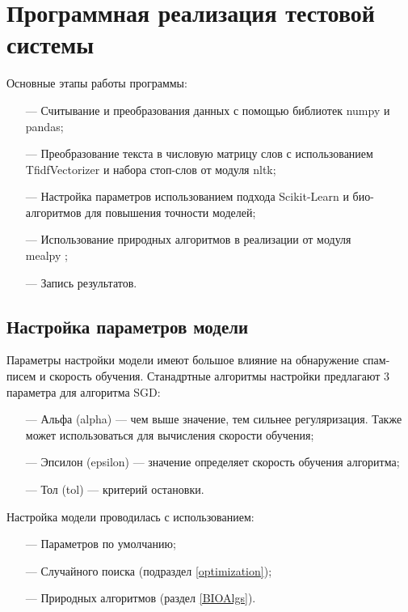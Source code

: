 \section{Программная реализация тестовой системы}

Основные этапы работы программы:

\begin{itemize}
    \item[—] Считывание и преобразования данных с помощью библиотек numpy и pandas;
    \item[—] Преобразование текста в числовую матрицу слов с использованием TfidfVectorizer\cite{scikitTfIdf} и набора стоп-слов от
        модуля nltk;
    \item[—] Настройка параметров использованием подхода Scikit-Learn \cite{scikitSGD} и био-алгоритмов
        для повышения точности моделей;
    \item[—] Использование природных алгоритмов в реализации от модуля \\mealpy \cite{thieu_nguyen_2020_3711949};
    \item[—] Запись результатов.
\end{itemize}

\subsection{Настройка параметров модели}

Параметры настройки модели имеют большое влияние на обнаружение спам-писем и скорость обучения. Станадртные
алгоритмы настройки предлагают 3 параметра для алгоритма SGD:

\begin{itemize}
    \item[—] Альфа (alpha) — чем выше значение, тем сильнее регуляризация. Также может использоваться для вычисления скорости обучения;
    \item[—] Эпсилон (epsilon) — значение определяет скорость обучения алгоритма;
    \item[—] Тол (tol) — критерий остановки.
\end{itemize}

Настройка модели проводилась с использованием:

\begin{itemize}
    \item[—] Параметров по умолчанию;
    \item[—] Случайного поиска (подраздел \ref{optimization});
    \item[—] Природных алгоритмов (раздел \ref{BIOAlgs}).
\end{itemize}


